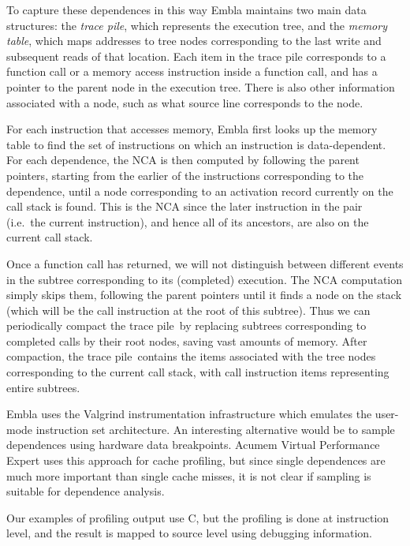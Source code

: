 \newcommand{\tracepile}{trace pile}

To capture these dependences in this way
Embla maintains two main data structures: the {\em \tracepile}, which represents
the execution tree, and the {\em memory table}, which maps addresses to tree
nodes corresponding to the last write and subsequent reads of that
location. Each item in the trace pile corresponds to a function call
or a memory access instruction inside a function call, and has a
pointer to the parent node in the execution tree. There is also
other information associated with a
node, such as what source line corresponds to the node.

For each instruction that accesses memory, Embla first looks up the
memory table to find the set of instructions on which an instruction
is data-dependent. For each dependence, the NCA is then
computed by following the parent pointers, starting from the earlier
of the instructions corresponding to the dependence, until a node
corresponding to an activation record currently on the call stack is
found. This is the NCA since the later instruction in the pair (i.e.\ 
the current instruction), and hence all of its ancestors, are also
on the current call stack.

Once a function call has returned, we will not distinguish between 
different events in the subtree corresponding to its (completed) 
execution. The NCA computation simply skips them, following the 
parent pointers until it finds a node on the stack (which will be
the call instruction at the root of this subtree). Thus we can 
periodically compact the \tracepile\ by replacing subtrees
corresponding to completed calls by their root nodes, saving vast amounts
of memory.
After compaction, the \tracepile\ contains the items associated with the
tree nodes corresponding to the current call stack, with call instruction items
representing entire subtrees.

Embla uses the Valgrind instrumentation infrastructure which emulates
the user-mode instruction set architecture. An interesting alternative
would be to sample dependences using hardware data breakpoints.
Acumem Virtual Performance Expert \cite{hagersten2008improving}
uses this approach for cache
profiling, but since single dependences are much more important than
single cache misses, it is not clear if sampling is suitable for
dependence analysis.

Our examples of profiling
output use C, but
the profiling is done at instruction level, and the result is
mapped to source level using debugging information.


